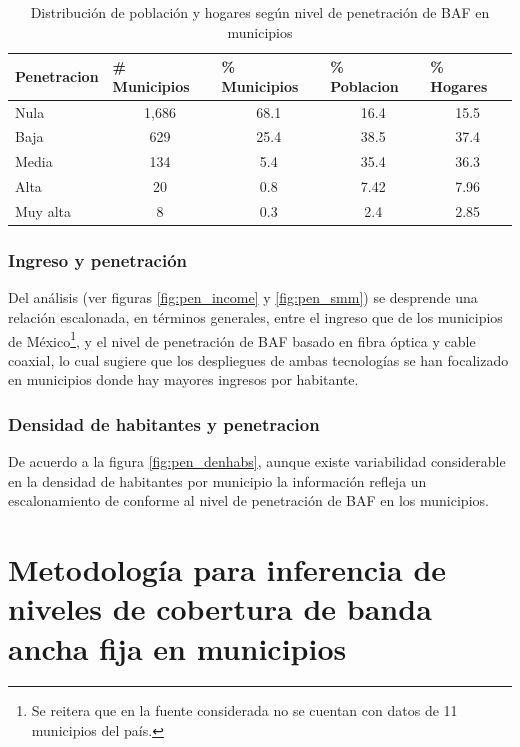 \documentclass[9pt,twocolumn,twoside]{ilcss}
\begin{document}
\begin{table}[tbhp]
\centering
\caption{Distribución de población y hogares según nivel de penetración de BAF en municipios}
\label{tab:dist_pob_hogs}
\begin{tabular}{@{}lcccc@{}}
	\toprule
	Penetracion & \multicolumn{1}{l}{\# Municipios} & \multicolumn{1}{l}{\% Municipios} & \multicolumn{1}{l}{\% Poblacion} & \multicolumn{1}{l}{\% Hogares} \\ \midrule
	Nula & 1,686 & 68.1 & 16.4 & 15.5 \\
	Baja & 629 & 25.4 & 38.5 & 37.4 \\
	Media & 134 & 5.4 & 35.4 & 36.3 \\
	Alta & 20 & 0.8 & 7.42 & 7.96 \\
	Muy alta & 8 & 0.3 & 2.4 & 2.85 \\ \bottomrule
\end{tabular}
\end{table}


\subsubsection{Ingreso y penetración}
Del análisis (ver figuras \ref{fig:pen_income} y \ref{fig:pen_smm}) se desprende una relación escalonada, en términos generales, entre el ingreso que de los municipios de México\footnote{Se reitera que en la fuente considerada no se cuentan con datos de 11 municipios del país.}, y el nivel de penetración de BAF basado en fibra óptica y cable coaxial, lo cual sugiere que los despliegues de ambas tecnologías se han focalizado en municipios donde hay mayores ingresos por habitante.



\subsubsection{Densidad de habitantes y penetracion}

De acuerdo a la figura \ref{fig:pen_denhabs}, aunque existe variabilidad considerable en la densidad de habitantes por municipio la información refleja un escalonamiento de conforme al nivel de penetración de BAF en los municipios.

\section{Metodología para inferencia de niveles de cobertura de banda ancha fija en municipios}
\end{document}
